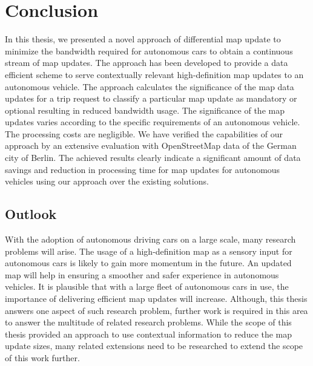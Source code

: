 \chapter{Conclusion} \label{ch:conclusion}
In this thesis, we presented a novel approach of differential map update to minimize the bandwidth required for autonomous cars to obtain a continuous stream of map updates. The approach has been developed to provide a data efficient scheme to serve contextually relevant high-definition map updates to an autonomous vehicle. The approach calculates the significance of the map data updates for a trip request to classify a particular map update as mandatory or optional resulting in reduced bandwidth usage. The significance of the map updates varies according to the specific requirements of an autonomous vehicle. The processing costs are negligible. We have verified the capabilities of our approach by an extensive evaluation with OpenStreetMap data of the German city of Berlin. The achieved results clearly indicate a significant amount of data savings and reduction in processing time for map updates for autonomous vehicles using our approach over the existing solutions.    
\section{Outlook}
With the adoption of autonomous driving cars on a large scale, many research problems will arise. The usage of a high-definition map as a sensory input for autonomous cars is likely to gain more momentum in the future. An updated map will help in ensuring a smoother and safer experience in autonomous vehicles. It is plausible that with a large fleet of autonomous cars in use, the importance of delivering efficient map updates will increase. Although, this thesis answers one aspect of such research problem, further work is required in this area to answer the multitude of related research problems. While the scope of this thesis provided an approach to use contextual information to reduce the map update sizes, many related extensions need to be researched to extend the scope of this work further. 

